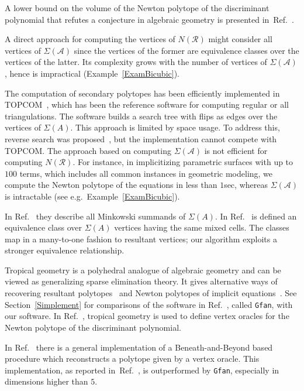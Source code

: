 \documentclass{article}
\newcommand\refcite[1]{\citealp{#1}} \newcommand\citess[1]{\textsuperscript{\textup{\citealp{#1}}}}
\def\A{{\mathcal A}} \def\R{{\mathcal R}}
\begin{document}
A lower bound on the volume of the Newton polytope of the discriminant polynomial 
that refutes a conjecture in algebraic geometry  
is presented in~Ref.~\refcite{discrim_vol}.

A direct approach for computing the vertices of $N(\R)$ might
consider all vertices of $\Sigma(\A)$ since the vertices of
the former are equivalence classes over the vertices of the latter.
Its complexity grows with the number of vertices
of $\Sigma(\A)$, hence is impractical (Example~\ref{ExamBicubic}).

The computation of secondary polytopes has been efficiently implemented in
TOPCOM~\citess{RambTOPCOM}, which has been the reference software for computing
regular or all triangulations.  
The software builds a search tree with flips as edges over the vertices of $\Sigma(A)$.  
This approach is limited by space usage.  
To address this, reverse search was proposed~\citess{IMTI02}, but the
implementation cannot compete with TOPCOM.
The approach based on computing $\Sigma(\A)$ is not efficient
for computing $N(\R)$.
For instance, in implicitizing parametric surfaces with up to $100$
terms, which includes all common instances in geometric modeling,
we compute the Newton polytope of the equations in less than $1$sec,
whereas $\Sigma(\A)$ is intractable (see e.g.\ Example~\ref{ExamBicubic}). 

In Ref.~\refcite{MicCoo00} they describe all Minkowski summands of $\Sigma(A)$.
In Ref.~\refcite{MicVer99} is defined an equivalence class over
$\Sigma(A)$ vertices having the same mixed cells.
The classes map in a many-to-one fashion to resultant vertices;
our algorithm exploits a stronger equivalence relationship.

Tropical geometry is a polyhedral analogue of algebraic geometry 
and can be viewed as generalizing sparse elimination theory.
It gives alternative ways of recovering resultant
polytopes~\citess{JensenYu11} and Newton polytopes of implicit
equations~\citess{StuYu08}. 
See Section~\ref{Simplement} for comparisons of 
the software in Ref.~\refcite{JensenYu11}, called {\tt Gfan},  
with our software.
In Ref.~\refcite{Rincon12}, tropical geometry
is used to define vertex oracles for the Newton polytope of the
discriminant polynomial.

In Ref.~\refcite{Hug06} there is a general implementation of a
Beneath-and-Beyond based procedure which reconstructs a polytope given by a
vertex  oracle. This implementation, as reported in~Ref.~\refcite{JensenYu11}, 
is outperformed by {\tt Gfan}, especially in dimensions higher than $5$. 
\end{document}
